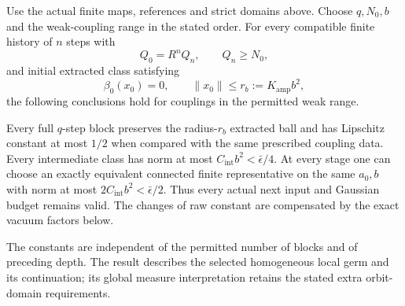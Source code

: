 \begin{theorem}
\label{fqi-theorem}
Use the actual finite maps, references and strict domains above.
Choose $q,N_0,b$ and the weak-coupling range in the stated order.
For every compatible finite history of $n$ steps with
\begin{equation}
 Q_0=R^nQ_n,\qquad Q_n\ge N_0,
 \label{fqi-history-periods}
\end{equation}
and initial extracted class satisfying
\begin{equation}
 \beta_0(x_0)=0,\qquad
 \|x_0\|\le r_b:=K_{\mathrm{amp}}b^2,
 \label{fqi-initial-ball}
\end{equation}
the following conclusions hold for couplings in the permitted
weak range.

Every full $q$-step block preserves the radius-$r_b$ extracted
ball and has Lipschitz constant at most $1/2$ when compared
with the same prescribed coupling data. Every intermediate
class has norm at most $C_{\mathrm{int}}b^2<\bar\epsilon/4$.
At every stage one can choose an exactly equivalent connected
finite representative on the same $a_0,b$ with norm at most
$2C_{\mathrm{int}}b^2<\bar\epsilon/2$. Thus every actual next
input and Gaussian budget remains valid. The changes of raw
constant are compensated by the exact vacuum factors below.

The constants are independent of the permitted number of
blocks and of preceding depth. The result describes the
selected homogeneous local germ and its continuation; its
global measure interpretation retains the stated extra
orbit-domain requirements.
\end{theorem}

